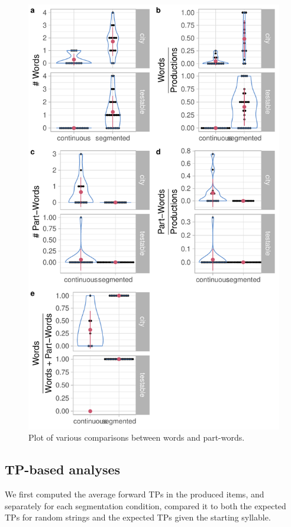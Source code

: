\documentclass[]{article}
\begin{document}
\begin{figure}

{\centering \includegraphics[width=0.8\linewidth]{segmentation_recall_combined_files/figure-latex/recall-words-part-words-plot-1} 

}

\caption{Plot of various comparisons between words and part-words.}\label{fig:recall-words-part-words-plot}
\end{figure}

\subsection{TP-based analyses}\label{tp-based-analyses}

We first computed the average forward TPs in the produced items, and
separately for each segmentation condition, compared it to both the
expected TPs for random strings and the expected TPs given the starting
syllable.
\end{document}
